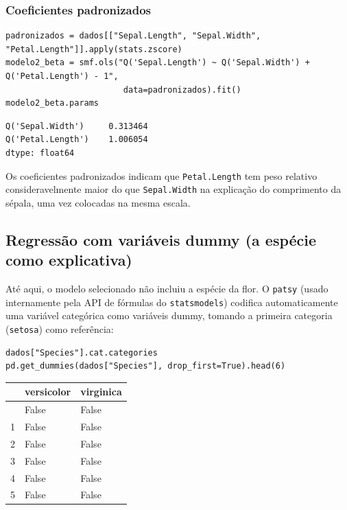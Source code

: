 \documentclass[a4paper]{_extensions/modeloufcg/modeloUFCG}
\newcounter{none} %
\begin{document}
\subsubsection{Coeficientes
padronizados}\label{coeficientes-padronizados}

\begin{verbatim}
padronizados = dados[["Sepal.Length", "Sepal.Width", "Petal.Length"]].apply(stats.zscore)
modelo2_beta = smf.ols("Q('Sepal.Length') ~ Q('Sepal.Width') + Q('Petal.Length') - 1",
                        data=padronizados).fit()
modelo2_beta.params
\end{verbatim}

\begin{verbatim}
Q('Sepal.Width')     0.313464
Q('Petal.Length')    1.006054
dtype: float64
\end{verbatim}

Os coeficientes padronizados indicam que \texttt{Petal.Length} tem peso
relativo consideravelmente maior do que \texttt{Sepal.Width} na
explicação do comprimento da sépala, uma vez colocadas na mesma escala.

\subsection{Regressão com variáveis dummy (a espécie como
explicativa)}\label{regressuxe3o-com-variuxe1veis-dummy-a-espuxe9cie-como-explicativa}

Até aqui, o modelo selecionado não incluiu a espécie da flor. O
\texttt{patsy} (usado internamente pela API de fórmulas do
\texttt{statsmodels}) codifica automaticamente uma variável categórica
como variáveis dummy, tomando a primeira categoria (\texttt{setosa})
como referência:

\begin{verbatim}
dados["Species"].cat.categories
pd.get_dummies(dados["Species"], drop_first=True).head(6)
\end{verbatim}

{\def\LTcaptype{none} %
\begin{longtable}[]{@{}lll@{}}
\toprule\noalign{}
& versicolor & virginica \\
\midrule\noalign{}
\endhead
\bottomrule\noalign{}
\endlastfoot
0 & False & False \\
1 & False & False \\
2 & False & False \\
3 & False & False \\
4 & False & False \\
5 & False & False \\
\end{longtable}
}
\end{document}
